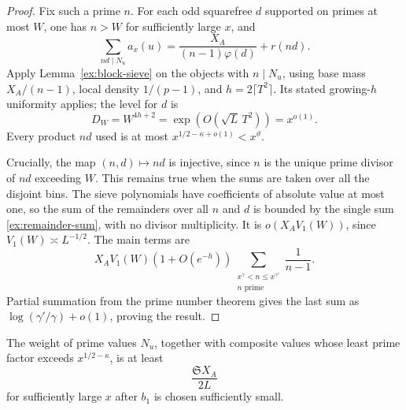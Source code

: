 \begin{proof}
Fix such a prime $n$. For each odd squarefree $d$ supported on
primes at most $W$, one has $n>W$ for sufficiently large $x$, and
\[
 \sum_{nd\mid N_u}a_x(u)
   =\frac{X_A}{(n-1)\varphi(d)}+r(nd).
\]
Apply Lemma~\ref{ex:block-sieve} on the objects with $n\mid N_u$,
using base mass $X_A/(n-1)$, local density $1/(p-1)$, and
$h=2\lceil T^2\rceil$. Its stated growing-$h$ uniformity applies;
the level for $d$ is
\[
 D_W=W^{4h+2}=\exp(O(\sqrt L\,T^2))=x^{o(1)}.
\]
Every product $nd$ used is at most
$x^{1/2-\kappa+o(1)}<x^\vartheta$.

Crucially, the map $(n,d)\mapsto nd$ is injective, since $n$ is
the unique prime divisor of $nd$ exceeding $W$. This remains true
when the sums are taken over all the disjoint bins. The sieve
polynomials have coefficients of absolute value at most one, so
the sum of the remainders over all $n$ and $d$ is bounded by the
single sum \eqref{ex:remainder-sum}, with no divisor multiplicity.
It is $o(X_AV_1(W))$, since $V_1(W)\asymp L^{-1/2}$.
The main terms are
\[
 X_AV_1(W)(1+O(e^{-h}))
          \sum_{\substack{x^\gamma<n\le x^{\gamma'}\\n\text{ prime}}}
                         \frac1{n-1}.
\]
Partial summation from the prime number theorem gives the last
sum as $\log(\gamma'/\gamma)+o(1)$, proving the result.
\end{proof}

\begin{lemma}\label{ex:unbalanced}
The weight of prime values $N_u$, together with composite values
whose least prime factor exceeds $x^{1/2-\kappa}$, is at least
\begin{equation}\label{ex:surviving-mass}
 \frac{\mathfrak S X_A}{2L}
\end{equation}
for sufficiently large $x$ after $b_1$ is chosen sufficiently small.
\end{lemma}

